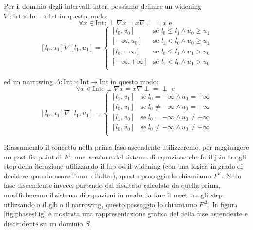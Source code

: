 \begin{example}
Per il dominio degli intervalli interi possiamo definire un widening \(\nabla:\textrm{Int}\times\textrm{Int}\rightarrow\textrm{Int}\) in questo modo: 
\[\forall x\in \textrm{Int}: \perp\nabla x = x\nabla\perp = x \textrm{ e } \]
\[
[l_0, u_0]\nabla[l_1, u_1] = 
\begin{cases}
    [l_0, u_0] & \textrm{se } l_0\leq l_1 \wedge u_0 \geq u_1 \\
    [-\infty, u_0] & \textrm{se } l_1 < l_0 \wedge u_0 \geq u_1 \\
    [l_0, +\infty] & \textrm{se } l_0\leq l_1 \wedge u_1 > u_0 \\
    [-\infty, +\infty] & \textrm{se } l_1 < l_0 \wedge u_1 > u_0 \\
\end{cases}
\]

ed un narrowing \(\Delta:\textrm{Int}\times\textrm{Int}\rightarrow\textrm{Int}\) in questo modo: 
\[\forall x\in \textrm{Int}: \perp\nabla x = x\nabla\perp = \perp \textrm{ e } \]
\[
[l_0, u_0]\nabla[l_1, u_1] = 
\begin{cases}
    [l_1, u_1] & \textrm{se } l_0 = -\infty \wedge u_0 = +\infty \\
    [l_0, u_1] & \textrm{se } l_0 \neq -\infty \wedge u_0 = +\infty \\
    [l_1, u_0] & \textrm{se } l_0 = -\infty \wedge u_0 \neq +\infty \\
    [l_0, u_0] & \textrm{se } l_0 \neq -\infty \wedge u_0 \neq +\infty \\
\end{cases}
\]
\end{example}

Riassumendo il concetto nella prima fase ascendente utilizzeremo, per raggiungere un post-fix-point di \(F^{\natural}\), una versione del sistema di equazione che fa il join tra gli step della iterazione utilizzando il lub od il widening (con una logica in grado di decidere quando usare l'uno o l'altro), questo passaggio lo chiamiamo \(F^{\nabla}\). Nella fase discendente invece, partendo dal risultato calcolato da quella prima, modificheremo il sistema di equazioni in modo da fare il meet tra gli step utlizzando o il glb o il narrowing, questo passaggio lo chiamiamo \(F^{\Delta}\). 
In figura \ref{fig:phasesFig} è mostrata una rappresentazione grafica del della fase ascendente e discendente su un dominio \(S\).


